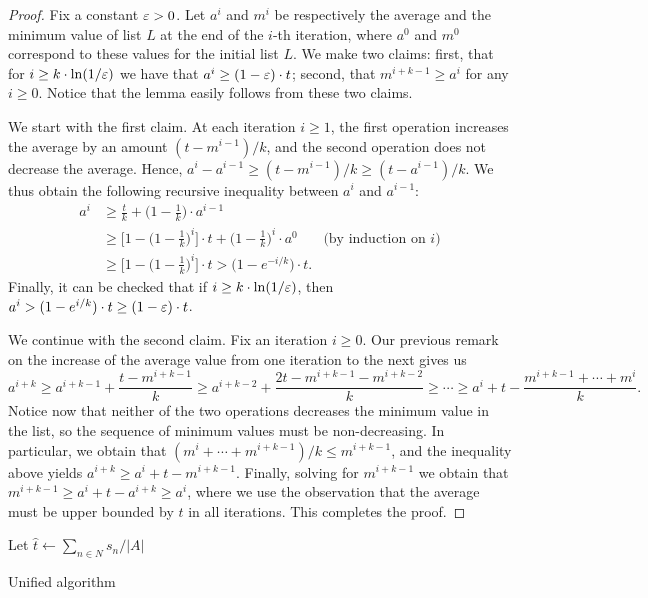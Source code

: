 \begin{proof}
Fix a constant $\varepsilon>0$. Let $a^i$ and $m^i$ be respectively the average and the minimum value of list $L$ at the end of the $i$-th iteration, where $a^0$ and $m^0$ correspond to these values for the initial list $L$. 
We make two claims: first, that for $i\geq k\cdot \ln(1/\varepsilon)$ we have that $a^i \geq (1-\varepsilon) \cdot t$; 
second, that $m^{i+k-1}\geq a^i$ for any $i\geq 0$. Notice that the lemma easily follows from these two claims.

We start with the first claim. At each iteration $i\geq 1$, the first operation increases the average by an amount $(t - m^{i-1})/k$, and the second operation does not decrease the average. Hence, $a^i - a^{i-1}\geq (t-m^{i-1})/k \geq (t-a^{i-1})/k$. We thus obtain the following recursive inequality between $a^{i}$ and $a^{i-1}$:
\begin{align*}
a^i &\geq \frac{t}{k} + \Big( 1-\frac{1}{k} \Big) \cdot a^{i-1}\\
  &\geq \Big[ 1-\Big( 1-\frac{1}{k} \Big)^i \Big]\cdot t + \Big(1 - \frac{1}{k}\Big)^i\cdot a^0 & \text{(by induction on $i$)} \\
	&\geq \Big[ 1-\Big( 1-\frac{1}{k} \Big)^i \Big]\cdot t 
	 > \big( 1 - e^{-i/k} \big) \cdot t.
\end{align*}
Finally, it can be checked that if $i\geq k\cdot \ln (1/\varepsilon)$, then $a^i > (1 - e^{i/k})\cdot t \geq (1-\varepsilon)\cdot t$. 

We continue with the second claim. Fix an iteration $i\geq 0$. Our previous remark on the increase of the average value from one iteration to the next gives us 
$$a^{i+k}\geq a^{i+k-1} + \frac{t - m^{i+ k -1}}{k} \geq a^{i+ k - 2} + \frac{2t - m^{i+k-1} - m^{i+k-2}}{k} \geq \cdots \geq a^i + t - \frac{m^{i+k-1}+\cdots + m^i}{k}.$$ 
Notice now that neither of the two operations decreases the minimum value in the list, so the sequence of minimum values must be non-decreasing. 
In particular, we obtain that $(m^i + \cdots +m^{i+k-1})/k \leq m^{i+k-1}$, and the inequality above yields $a^{i+k}\geq a^i + t - m^{i+k-1}$.  
Finally, solving for $m^{i+k-1}$ we obtain that $m^{i+k-1}\geq a^i + t - a^{i+k}\geq a^i$, where we use the observation that the average must be upper bounded by $t$ in all iterations. This completes the proof.
\end{proof}

\begin{algorithm}[htb]\label{alg:unified}
\SetAlgoLined
{}

Let $\hat{t}\leftarrow \sum_{n\in N} s_n / |A|$\;
\caption{Unified algorithm}
\end{algorithm}

